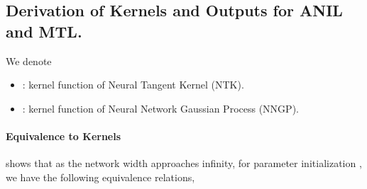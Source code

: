 \documentclass{article}
\begin{document}
\subsection{Derivation of Kernels and Outputs for ANIL and MTL.}\label{supp:proof:predictors&kernels}
\begin{notation} We denote
    \begin{itemize}
        \item : kernel function of Neural Tangent Kernel (NTK).
        \item : kernel function of Neural Network Gaussian Process (NNGP).
    \end{itemize}
\end{notation}

\paragraph{Equivalence to Kernels} \citet{lee2019wide} shows that as the network width  approaches infinity, for parameter initialization , we have the following equivalence relations,
\end{document}
